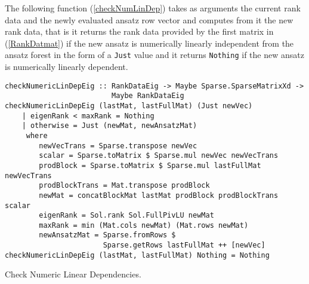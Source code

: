 The following function (\ref{checkNumLinDep}) takes as arguments the current rank data and the newly evaluated ansatz row vector and computes from it the new rank data, that is it returns the rank data provided by the first matrix in (\ref{RankDatmat}) if the new ansatz is numerically linearly independent from the ansatz forest in the form of a \texttt{Just} value and it returns \texttt{Nothing} if the new ansatz is numerically linearly dependent. 

\begin{listing}[hbt!]
\begin{verbatim}
checkNumericLinDepEig :: RankDataEig -> Maybe Sparse.SparseMatrixXd ->
                         Maybe RankDataEig
checkNumericLinDepEig (lastMat, lastFullMat) (Just newVec)
    | eigenRank < maxRank = Nothing
    | otherwise = Just (newMat, newAnsatzMat)
     where
        newVecTrans = Sparse.transpose newVec
        scalar = Sparse.toMatrix $ Sparse.mul newVec newVecTrans
        prodBlock = Sparse.toMatrix $ Sparse.mul lastFullMat newVecTrans
        prodBlockTrans = Mat.transpose prodBlock
        newMat = concatBlockMat lastMat prodBlock prodBlockTrans scalar
        eigenRank = Sol.rank Sol.FullPivLU newMat
        maxRank = min (Mat.cols newMat) (Mat.rows newMat)
        newAnsatzMat = Sparse.fromRows $ 
                       Sparse.getRows lastFullMat ++ [newVec]
checkNumericLinDepEig (lastMat, lastFullMat) Nothing = Nothing
\end{verbatim} 
\caption{Check Numeric Linear Dependencies.}\label{checkNumLinDep}
\end{listing}

